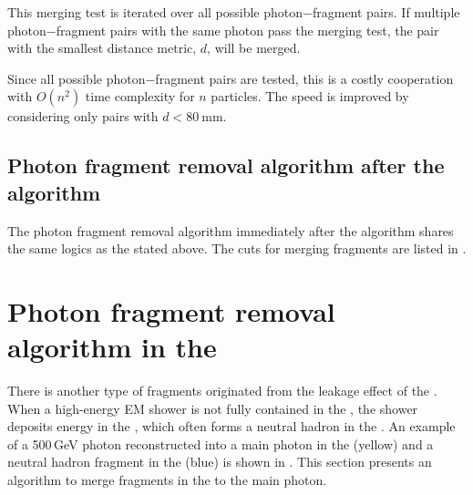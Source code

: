 

This merging test is iterated over all possible  photon$-$fragment pairs. If multiple photon$-$fragment pairs with the same photon pass the merging test, the pair with the smallest distance metric, $d$, will be merged.

Since all possible photon$-$fragment pairs are tested, this is a costly cooperation with $O(n^2)$ time complexity for $n$ particles. The speed is improved by considering only pairs with $d<80\ \text{mm}$.




\subsection{Photon fragment removal algorithm after the \PhotonReconstruction algorithm}

The photon fragment removal algorithm immediately after the \PhotonReconstruction algorithm shares the same logics as the stated above. The cuts for merging fragments are listed in .


\section{Photon fragment removal algorithm in the \HCAL}
\label{sec:photonHighEFragRemoval}


There is another type of fragments originated from the leakage effect of the \ECAL. When a high-energy EM shower is not fully contained in the \ECAL, the shower deposits energy in the \HCAL, which often forms a neutral hadron in the \HCAL. An example of a 500\,GeV photon reconstructed into a main photon in the \ECAL (yellow) and a neutral hadron fragment in the \HCAL (blue) is shown in . This section presents an algorithm to merge fragments in the \HCAL to the main photon.

